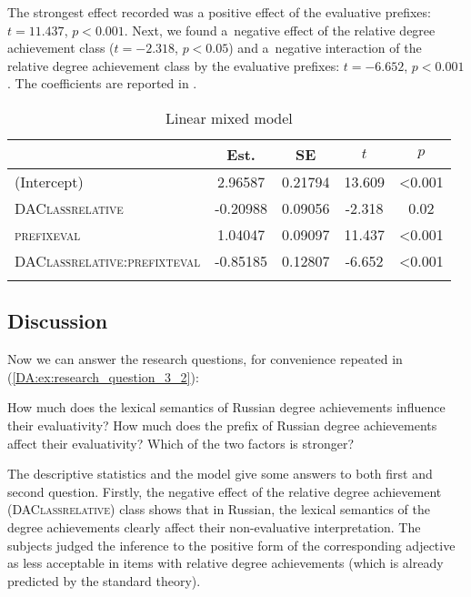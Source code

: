 \documentclass[output=paper]{langscibook}
\begin{document}
The strongest effect recorded was a positive effect of the evaluative prefixes: $t = 11.437$, $p < 0.001$. Next, we found a~negative effect of the relative degree achievement class ($t = -2.318$, $p <0.05$) and a~negative interaction of the relative degree achievement class by the evaluative prefixes: $t = -6.652$, $p < 0.001$. The coefficients are reported in .

\begin{table}
\caption{Linear mixed model}
\label{DA:tab:model}
 \begin{tabular}{l S[table-format=-1.5] S[table-format=1.5] S[table-format=-1.3] S[table-format=<1.3]}
  \lsptoprule
   & {Est.} &  {SE} & {$t$} & {$p$}\\
   \midrule
  (Intercept)                          & 2.96587  & 0.21794 & 13.609 & <0.001  \\
  \textsc{DAClassrelative}             & -0.20988 & 0.09056 & -2.318 & 0.02 \\
  \textsc{prefixeval}                  & 1.04047  & 0.09097 & 11.437 & <0.001 \\
  \textsc{DAClassrelative:prefixteval} & -0.85185 & 0.12807 & -6.652 & <0.001 \\
  \lspbottomrule
 \end{tabular}
\end{table}

\subsection{Discussion}\label{DA:subsec:Discussion}

Now we can answer the research questions, for convenience repeated in (\ref{DA:ex:research_question_3_2}):

\eanoraggedright\label{DA:ex:research_question_3_2}\eanoraggedright How much does the lexical semantics of Russian degree achievements influence their evaluativity?
\ex How much does the prefix of Russian degree achievements affect their evaluativity? 
\ex Which of the two factors is stronger?
\z\z

\noindent The descriptive statistics and the model give some answers to both first and second question. Firstly, the negative effect of the relative degree achievement (\textsc{DAClassrelative}) class shows that in Russian, the lexical semantics of the degree achievements clearly affect their non-evaluative interpretation. The subjects judged the inference to the positive form of the corresponding adjective as less acceptable in items with relative degree achievements (which is already predicted by the standard theory). 
\end{document}
